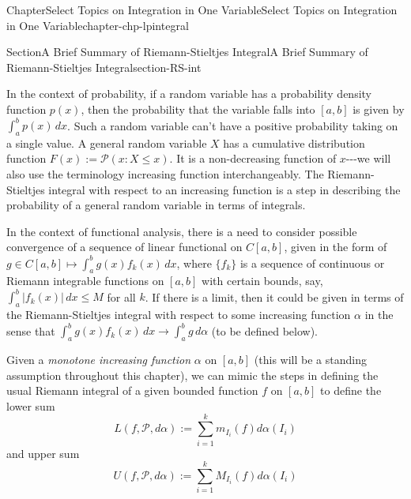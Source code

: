 \documentclass[oneside,10pt,]{book}
\numberwithin{equation}{section}
\newcommand{\cP}{\mathcal{P}}
\begin{document}
\begin{chapterptx}{Chapter}{Select Topics on Integration in One Variable}{}{Select Topics on Integration in One Variable}{}{}{chapter-chp-lpintegral}
\renewcommand*{\chaptername}{Chapter}
%
%
\typeout{************************************************}
\typeout{************************************************}
%
\begin{sectionptx}{Section}{A Brief Summary of Riemann-Stieltjes Integral}{}{A Brief Summary of Riemann-Stieltjes Integral}{}{}{section-RS-int}
\begin{introduction}{}%
In the context of probability, if a random variable has a probability density function \(p(x)\), then the probability that the variable falls into \([a, b]\) is given by \(\int_{a}^{b} p(x)\, dx\). Such a random variable can't have a positive probability taking on a single value. A general random variable \(X\) has a cumulative distribution	function \(F(x) :=\cP(x: X\le x)\). It is a non-decreasing function of \(x\)-{}-{}-we will also use the terminology increasing function interchangeably. The Riemann-Stieltjes integral with respect to an increasing function is a step in describing the probability of a general random variable in terms of integrals.%
\par
In the context of functional analysis, there is a need to consider possible convergence of a sequence of linear functional on \(C[a, b]\), given in the form of \(g\in C[a, b]\mapsto \int_{a}^{b} g(x)f_{k}(x)\, dx\), where \(\{f_{k}\}\) is a sequence of continuous or Riemann integrable functions on \([a, b]\) with certain bounds, say, \(\int_{a}^{b} |f_{k}(x)|\, dx\le M\) for all \(k\). If there is a limit, then it could be given in terms of the Riemann-Stieltjes integral with respect to some increasing function \(\alpha\) in the sense that \(\int_{a}^{b} g(x)f_{k}(x)\, dx\to \int_{a}^{b} g\, d\alpha\) (to be defined below).%
\end{introduction}%
Given a \emph{monotone increasing function} \(\alpha\) on \([a, b]\) (this will be a standing assumption throughout this chapter), we can mimic the steps in defining the usual Riemann integral of a given bounded function \(f\) on \([a, b]\) to define the lower sum%
\begin{equation*}
L(f, \cP, d \alpha)  :=\sum_{i=1}^{k} m_{I_{i}} (f) d\alpha(I_{i})
\end{equation*}
and upper sum%
\begin{equation*}
U(f, \cP, d \alpha)  :=\sum_{i=1}^{k} M_{I_{i}} (f) d\alpha (I_{i})

\end{equation*}
\end{sectionptx}
\end{chapterptx}
\end{document}
